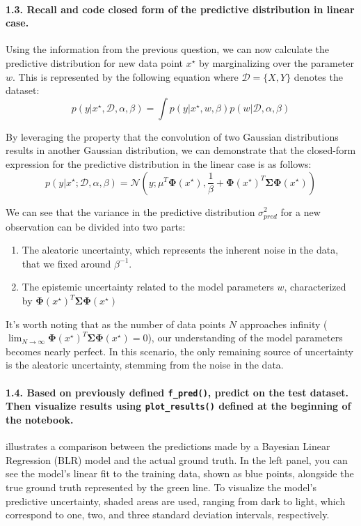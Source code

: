 \paragraph*{1.3. Recall and code closed form of the predictive distribution in linear case.}
Using the information from the previous question, we can now calculate the predictive distribution for new data point $x^\star$ by marginalizing over the parameter $w$. This is represented by the following equation where $\mathcal{D} = \{X,Y\}$ denotes the dataset:
\[ p(y|x^\star , \mathcal{D}, \alpha, \beta ) = \int p(y| x^\star, w, \beta)p(w| \mathcal{D}, \alpha, \beta ) \]

By leveraging the property that the convolution of two Gaussian distributions results in another Gaussian distribution, we can demonstrate that the closed-form expression for the predictive distribution in the linear case is as follows:
\[ p\left(y|x^\star; \mathcal{D}, \alpha, \beta\right) = \mathcal{N}\left(y; \mu^T \boldsymbol{\Phi}(x^\star), \frac{1}{\beta} + \boldsymbol{\Phi}(x^\star)^T \boldsymbol{\Sigma} \boldsymbol{\Phi}(x^\star)\right) \]

We can see that the variance in the predictive distribution $ \sigma ^2_{pred} $  for a new observation can be divided into two parts:
\begin{enumerate}
    \item The aleatoric uncertainty, which represents the inherent noise in the data, that we fixed around $ \beta ^{-1} $. 
    \item The epistemic uncertainty related to the model parameters $ w $, characterized by $\boldsymbol{\Phi}(x^\star)^T \boldsymbol{\Sigma} \boldsymbol{\Phi}(x^\star) $ 
\end{enumerate}
It's worth noting that as the number of data points $N$ approaches infinity ($ \lim_{N \to \infty} \boldsymbol{\Phi}(x^\star)^T \boldsymbol{\Sigma} \boldsymbol{\Phi}(x^\star) = 0 $), our understanding of the model parameters becomes nearly perfect. In this scenario, the only remaining source of uncertainty is the aleatoric uncertainty, stemming from the noise in the data.

\paragraph*{1.4. Based on previously defined \texttt{f\_pred()}, predict on the test dataset. Then visualize results using \texttt{plot\_results()} defined at the beginning of the notebook.}
 illustrates a comparison between the predictions made by a Bayesian Linear Regression (BLR) model and the actual ground truth. In the left panel, you can see the model's linear fit to the training data, shown as blue points, alongside the true ground truth represented by the green line. To visualize the model's predictive uncertainty, shaded areas are used, ranging from dark to light, which correspond to one, two, and three standard deviation intervals, respectively.

